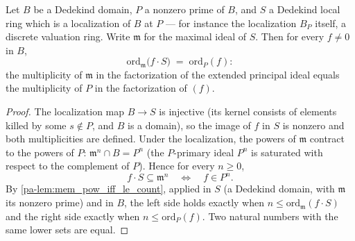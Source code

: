 \begin{theorem}
  \label{pa-thm:count_factors_span_localization}
  \leanok

  Let \(B\) be a Dedekind domain, \(P\) a nonzero prime of \(B\), and \(S\) a Dedekind
  local ring which is a localization of \(B\) at \(P\) --- for instance the
  localization \(B_P\) itself, a discrete valuation ring. Write \(\mathfrak m\) for the
  maximal ideal of \(S\). Then for every \(f \neq 0\) in \(B\),
  \[
    \mathrm{ord}_{\mathfrak m}\bigl(f \cdot S\bigr) \;=\; \mathrm{ord}_P(f) :
  \]
  the multiplicity of \(\mathfrak m\) in the factorization of the extended principal
  ideal equals the multiplicity of \(P\) in the factorization of \((f)\).
\end{theorem}
\begin{proof}
  \leanok
  The localization map \(B \to S\) is injective (its kernel consists of elements killed
  by some \(s \notin P\), and \(B\) is a domain), so the image of \(f\) in \(S\) is
  nonzero and both multiplicities are defined. Under the localization, the powers of
  \(\mathfrak m\) contract to the powers of \(P\): \(\mathfrak m^n \cap B = P^n\)
  (the \(P\)-primary ideal \(P^n\) is saturated with respect to the complement of
  \(P\)). Hence for every \(n \ge 0\),
  \[
    f \cdot S \subseteq \mathfrak m^n
    \quad\Longleftrightarrow\quad
    f \in P^n .
  \]
  By \ref{pa-lem:mem_pow_iff_le_count}, applied in \(S\) (a Dedekind domain, with
  \(\mathfrak m\) its nonzero prime) and in \(B\), the left side holds exactly when
  \(n \le \mathrm{ord}_{\mathfrak m}(f \cdot S)\) and the right side exactly when
  \(n \le \mathrm{ord}_P(f)\). Two natural numbers with the same lower sets are equal.
\end{proof}

